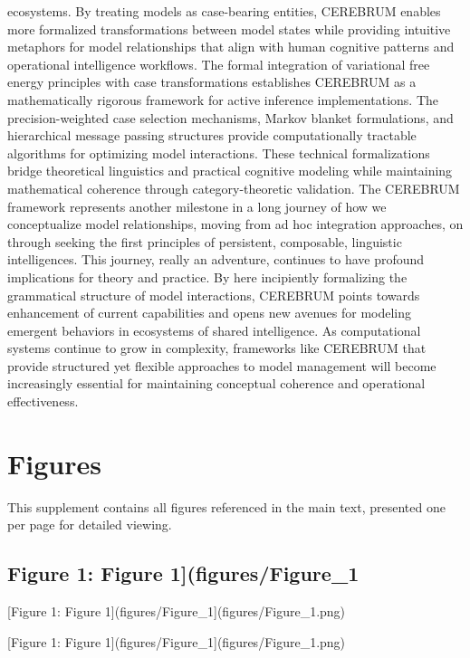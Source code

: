 \documentclass[
  11pt,
  letterpaper,
]{article}
\begin{document}
ecosystems. By treating models as case-bearing entities, CEREBRUM
enables more formalized transformations between model states while
providing intuitive metaphors for model relationships that align with
human cognitive patterns and operational intelligence workflows. The
formal integration of variational free energy principles with case
transformations establishes CEREBRUM as a mathematically rigorous
framework for active inference implementations. The precision-weighted
case selection mechanisms, Markov blanket formulations, and hierarchical
message passing structures provide computationally tractable algorithms
for optimizing model interactions. These technical formalizations bridge
theoretical linguistics and practical cognitive modeling while
maintaining mathematical coherence through category-theoretic
validation. The CEREBRUM framework represents another milestone in a
long journey of how we conceptualize model relationships, moving from ad
hoc integration approaches, on through seeking the first principles of
persistent, composable, linguistic intelligences. This journey, really
an adventure, continues to have profound implications for theory and
practice. By here incipiently formalizing the grammatical structure of
model interactions, CEREBRUM points towards enhancement of current
capabilities and opens new avenues for modeling emergent behaviors in
ecosystems of shared intelligence. As computational systems continue to
grow in complexity, frameworks like CEREBRUM that provide structured yet
flexible approaches to model management will become increasingly
essential for maintaining conceptual coherence and operational
effectiveness.

\hypertarget{figures}{%
\section{Figures}\label{figures}}

This supplement contains all figures referenced in the main text,
presented one per page for detailed viewing.

\hypertarget{figure-1-figure-1figuresfigure_1}{%
\subsection{Figure 1: Figure
1{]}(figures/Figure\_1}\label{figure-1-figure-1figuresfigure_1}}

{[}Figure 1: Figure 1{]}(figures/Figure\_1{]}(figures/Figure\_1.png)

{[}Figure 1: Figure 1{]}(figures/Figure\_1{]}(figures/Figure\_1.png)
\end{document}
